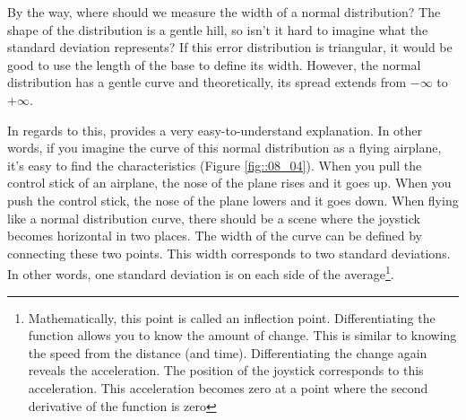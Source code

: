 \documentclass{ltjbook}
\begin{document}


By the way, where should we measure the width of a normal distribution? The shape of the distribution is a gentle hill, so isn't it hard to imagine what the standard deviation represents?
If this error distribution is triangular, it would be good to use the length of the base to define its width. However, the normal distribution has a gentle curve and theoretically, its spread extends from $-\infty$ to $+\infty$.

In regards to this, \textcite{Naganuma2201611} provides a very easy-to-understand explanation. In other words, if you imagine the curve of this normal distribution as a flying airplane, it's easy to find the characteristics (Figure \ref{fig::08_04}).
When you pull the control stick of an airplane, the nose of the plane rises and it goes up. When you push the control stick, the nose of the plane lowers and it goes down.
When flying like a normal distribution curve, there should be a scene where the joystick becomes horizontal in two places. The width of the curve can be defined by connecting these two points. This width corresponds to two standard deviations. In other words, one standard deviation is on each side of the average\footnote{Mathematically, this point is called an inflection point. Differentiating the function allows you to know the amount of change. This is similar to knowing the speed from the distance (and time). Differentiating the change again reveals the acceleration. The position of the joystick corresponds to this acceleration. This acceleration becomes zero at a point where the second derivative of the function is zero}.

\end{document}
